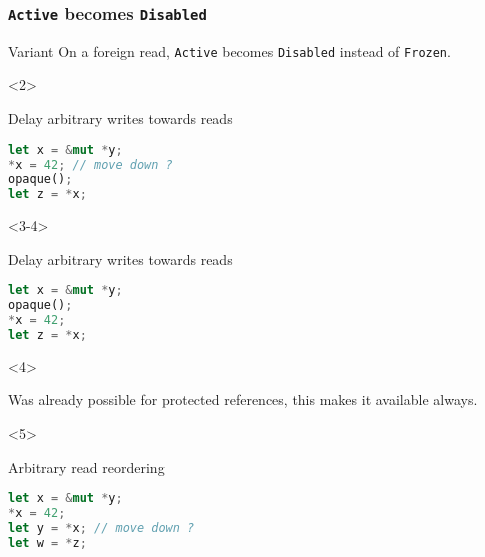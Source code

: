 \begin{frame}[fragile, t]
    \frametitle{\texttt{Active} becomes \texttt{Disabled}}

    \begin{exampleblock}{Variant}
        On a foreign read, \texttt{Active} becomes \texttt{Disabled} instead of \texttt{Frozen}.
    \end{exampleblock}


    \begin{onlyenv}<2>
        \begin{block}{{\cmark} Delay arbitrary writes towards reads}
            \begin{lstlisting}[language=rust, basicstyle=\ttfamily\scriptsize]
let x = &mut *y;
*x = 42; // move down ?
opaque();
let z = *x;
            \end{lstlisting}
        \end{block}
    \end{onlyenv}

    \begin{onlyenv}<3-4>
        \begin{block}{{\cmark} Delay arbitrary writes towards reads}
            \begin{lstlisting}[language=rust, basicstyle=\ttfamily\scriptsize]
let x = &mut *y;
opaque();
*x = 42;
let z = *x;
            \end{lstlisting}
        \end{block}
    \end{onlyenv}

    \begin{onlyenv}<4>
        \begin{block}{}
            Was already possible for protected references,
            this makes it available always.
        \end{block}
    \end{onlyenv}


    \begin{onlyenv}<5>
        \begin{block}{{\xmark} Arbitrary read reordering}
            \begin{lstlisting}[language=rust]
let x = &mut *y;
*x = 42;
let y = *x; // move down ?
let w = *z;
            \end{lstlisting}
        \end{block}
    \end{onlyenv}


\end{frame}
